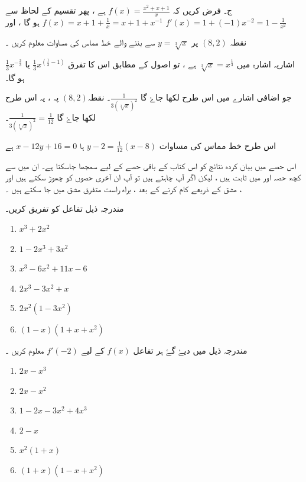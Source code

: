 ج۔ فرض کریں کہ \( f(x)= \frac{x^2+x+1}{x}\)  ہے ،
 پھر تقسیم کے لحاظ سے  \(f(x)=x+1+\frac{1}{x}=x+1+x^{-1}\) ہو گا 
، اور  \(f'(x)=1+(-1)x^{-2} = 1-\frac{1}{x^2}\)




نقطہ \((8,2)\) پر \(y=\sqrt[3]{x}\) سے بننے والے خط مماس کی مساوات معلوم کریں ۔ 

اشاریہ اشارہ میں \(\sqrt[3]{x}=x^{\frac{1}{3}}\) ہے ، تو اصول کے مطابق  اس کا تفرق \(\frac{1}{3}x^{(\frac{1}{3}-1)}\) یا \(\frac{1}{3}x^{-\frac{2}{3}}\) ہو گا۔

جو اضافی اشارے میں اس طرح لکھا جاۓ گا \(\frac{1}{3(\sqrt[3]{x})^2}\)۔  نقطہ\((8,2)\) پہ ، یہ اس طرح لکھا جاۓ گا \(\frac{1}{3(\sqrt[3]{x})^2}=\frac{1}{12}\)۔

اس طرح خط مماس کی مساوات \(y-2=\frac{1}{12}(x-8)\) ہا 
\(x-12y+16=0\) ہے

اس حصے میں بیان کردہ نتائج کو اس کتاب کے باقی حصے کے لیے سمجھا جاسکتا ہے۔ ان میں سے کچھ حصہ اور  میں ثابت ہیں ، لیکن اگر آپ چاہتے ہیں تو آپ ان آخری حصوں کو چھوڑ سکتے ہیں اور ، مشق  کے ذریعے کام کرنے کے بعد ، براہ راست متفرق  مشق  میں جا سکتے ہیں ۔


 
  مندرجہ ذیل تفاعل کو تفریق کریں۔

\begin{enumerate}[.a]
\item \(x^3+2x^2\)
\item \(1-2x^3+3x^2\)
\item \(x^3-6x^2+11x-6\)
\item \(2x^3-3x^2 +x\)
\item \(2x^2(1-3x^2)\)
\item \((1-x)(1+x+x^2)\)
\end{enumerate}

  مندرجہ ذیل میں دیۓ گۓ ہر تفاعل \(f(x)\) کے لیے \(f'(-2)\) معلوم کریں ۔

\begin{enumerate}[.a]
\item \(2x-x^3\)
\item \(2x-x^2\)
\item \(1-2x-3x^2+4x^3\)
\item \(2-x\)
\item \(x^2(1+x)\)
\item \((1+x)(1-x+x^2)\)
\end{enumerate}

